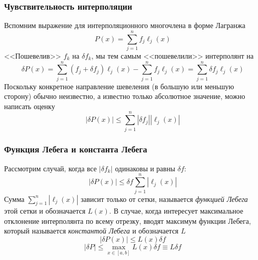 \documentclass[aspectratio=43,unicode]{beamer}
\begin{document}
\begin{frame}
\frametitle{Чувствительность интерполяции}
	Вспомним выражение для интерполяционного многочлена в форме Лагранжа
	\[
	P(x) = \sum_{j=1}^n f_j \ell_j(x)
	\]
	<<Пошевелив>> $f_k$ на $\delta f_k$, мы тем самым <<пошевелили>> интерполянт на
	\[
	\delta P(x) = \sum_{j=1}^n (f_j+\delta f_j) \ell_j(x) - \sum_{j=1}^n f_j \ell_j(x) = \sum_{j=1}^n \delta f_j \ell_j(x)
	\]
	Поскольку конкретное направление шевеления (в большую или меньшую сторону) обычно неизвестно, а известно только
	абсолютное значение, можно написать оценку
	\[
	|\delta P(x)| \leqslant \sum_{j=1}^n |\delta f_j| |\ell_j(x)|
	\]
\end{frame}

\begin{frame}
\frametitle{Функция Лебега и константа Лебега}
	Рассмотрим случай, когда все $|\delta f_k|$ одинаковы и равны $\delta f$:
	\[
	|\delta P(x)| \leqslant \delta f \sum_{j=1}^n |\ell_j(x)|
	\]
	Сумма $\sum_{j=1}^n |\ell_j(x)|$ зависит только от сетки, называется \emph{функцией Лебега} этой сетки и обозначается $L(x)$.
	В случае, когда интересует максимальное отклонение интерполянта по всему отрезку, вводят максимум функции Лебега,
	который называется \emph{константой Лебега} и обозначается $L$
	\[
	|\delta P(x)| \leqslant L(x) \delta f
	\]
	\[
	|\delta P| \leqslant \max_{x \in [a,b]} L(x)  \delta f \equiv L \delta f
	\]
\end{frame}
\end{document}
